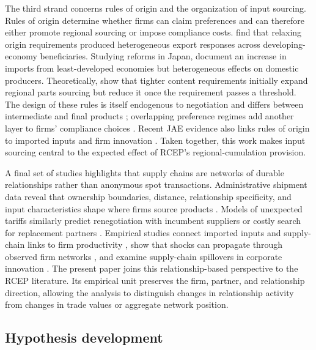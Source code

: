\documentclass[preprint,12pt,authoryear]{elsarticle}
\begin{document}
The third strand concerns rules of origin and the organization of input sourcing. Rules of origin determine whether firms can claim preferences and can therefore either promote regional sourcing or impose compliance costs. \citet{tanaka2022rooexports} find that relaxing origin requirements produced heterogeneous export responses across developing-economy beneficiaries. Studying reforms in Japan, \citet{hayakawa2023reform} document an increase in imports from least-developed economies but heterogeneous effects on domestic producers. Theoretically, \citet{head2024laffer} show that tighter content requirements initially expand regional parts sourcing but reduce it once the requirement passes a threshold. The design of these rules is itself endogenous to negotiation and differs between intermediate and final products \citep{hayakawa2024negotiating}; overlapping preference regimes add another layer to firms' compliance choices \citep{hayakawa2022multiple}. Recent JAE evidence also links rules of origin to imported inputs and firm innovation \citep{zhou2025origin}. Taken together, this work makes input sourcing central to the expected effect of RCEP's regional-cumulation provision.

A final set of studies highlights that supply chains are networks of durable relationships rather than anonymous spot transactions. Administrative shipment data reveal that ownership boundaries, distance, relationship specificity, and input characteristics shape where firms source products \citep{garg2023within}. Models of unexpected tariffs similarly predict renegotiation with incumbent suppliers or costly search for replacement partners \citep{grossman2024tariffs}. Empirical studies connect imported inputs and supply-chain links to firm productivity \citep{newman2023imports}, show that shocks can propagate through observed firm networks \citep{crosignani2022pirates}, and examine supply-chain spillovers in corporate innovation \citep{ou2026spillovers}. The present paper joins this relationship-based perspective to the RCEP literature. Its empirical unit preserves the firm, partner, and relationship direction, allowing the analysis to distinguish changes in relationship activity from changes in trade values or aggregate network position.

\subsection{Hypothesis development}
\end{document}
